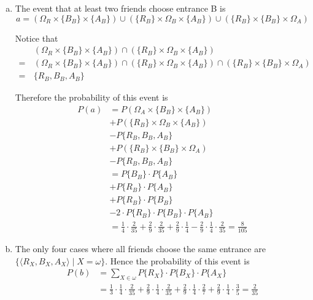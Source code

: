 \documentclass[a4paper,12pt]{article}
\begin{document}
\begin{enumerate}[(a)]
  \item The event that at least two friends choose entrance B is
    \[a = (\Omega_R \times \{B_B\} \times \{A_B\})
    \cup (\{R_B\} \times \Omega_B \times \{A_B\})
    \cup (\{R_B\} \times \{B_B\} \times \Omega_A)\]

    Notice that 
    \begin{align*}
      &(\Omega_R \times \{B_B\} \times \{A_B\})
      \cap (\{R_B\} \times \Omega_B \times \{A_B\})\\
      =\,&(\Omega_R \times \{B_B\} \times \{A_B\})
      \cap (\{R_B\} \times \Omega_B \times \{A_B\})
      \cap (\{R_B\} \times \{B_B\} \times \Omega_A)\\
      =\,&\{R_B, B_B, A_B\}
    \end{align*}

    Therefore the probability of this event is
    \begin{align*}
      P(a) &= P(\Omega_A \times \{B_B\} \times \{A_B\})\\
      &+ P(\{R_B\} \times \Omega_B \times \{A_B\})\\
      &- P\{R_B, B_B, A_B\}\\
      &+ P(\{R_B\} \times \{B_B\} \times \Omega_A)\\
      &- P\{R_B, B_B, A_B\}\\
      &= P\{B_B\} \cdot P\{A_B\}\\
      &+ P\{R_B\} \cdot P\{A_B\}\\
      &+ P\{R_B\} \cdot P\{B_B\}\\
      &- 2 \cdot P\{R_B\} \cdot P\{B_B\} \cdot P\{A_B\}\\
      &= \frac{1}{4} \cdot \frac{2}{35}
       + \frac{2}{9} \cdot \frac{2}{35}
       + \frac{2}{9} \cdot \frac{1}{4}
       - \frac{2}{9} \cdot \frac{1}{4} \cdot \frac{2}{35}
       = \frac{8}{105}
    \end{align*}
  \item The only four cases where all friends choose the same entrance are
    $\{\langle R_X, B_X, A_X\rangle \mid X = \omega\}$.
    Hence the probability of this event is
    \begin{align*}
      P(b) &= \sum_{X \in \omega} P\{R_X\}\cdot P\{B_X\}\cdot P\{A_X\}\\
      &= \frac{1}{3} \cdot \frac{1}{4} \cdot \frac{2}{35}
       + \frac{2}{9} \cdot \frac{1}{4} \cdot \frac{2}{35}
       + \frac{2}{9} \cdot \frac{1}{4} \cdot \frac{2}{7}
       + \frac{2}{9} \cdot \frac{1}{4} \cdot \frac{3}{5}
       = \frac{2}{35}
    \end{align*}
\end{enumerate}
\end{document}
